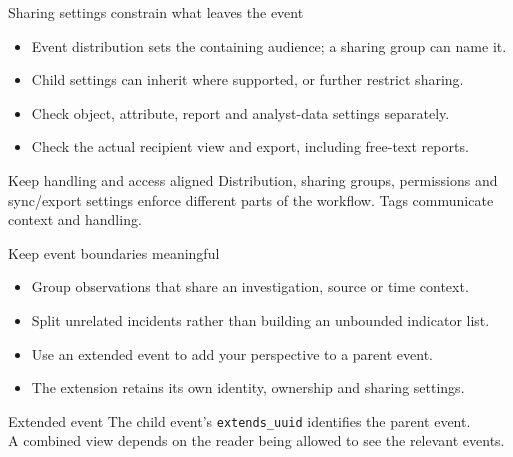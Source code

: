 \begin{frame}{Sharing settings constrain what leaves the event}
  \begin{itemize}
    \item Event distribution sets the containing audience; a sharing group can name it.
    \item Child settings can inherit where supported, or further restrict sharing.
    \item Check object, attribute, report and analyst-data settings separately.
    \item Check the actual recipient view and export, including free-text reports.
  \end{itemize}
  \begin{block}{Keep handling and access aligned}
    Distribution, sharing groups, permissions and sync/export settings enforce different parts of the workflow. Tags communicate context and handling.
  \end{block}
\end{frame}

\begin{frame}{Keep event boundaries meaningful}
  \begin{itemize}
    \item Group observations that share an investigation, source or time context.
    \item Split unrelated incidents rather than building an unbounded indicator list.
    \item Use an extended event to add your perspective to a parent event.
    \item The extension retains its own identity, ownership and sharing settings.
  \end{itemize}
  \begin{block}{Extended event}
    The child event's \texttt{extends\_uuid} identifies the parent event.\\
    A combined view depends on the reader being allowed to see the relevant events.
  \end{block}
\end{frame}

